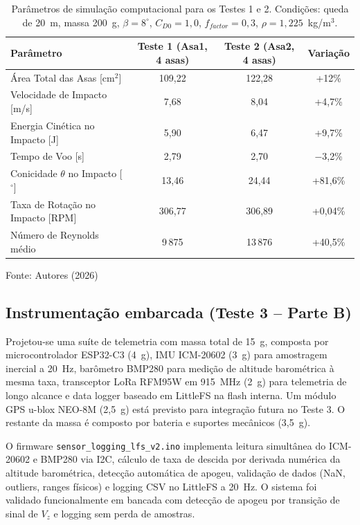 \documentclass[12pt,fleqn]{article}
\begin{document}
\begin{table}[htbp]
\caption{Parâmetros de simulação computacional para os Testes 1 e 2. Condições: queda de 20~m, massa 200~g, $\beta=8^\circ$, $C_{D0}=1,0$, $f_{factor}=0,3$, $\rho=1,225$~kg/m$^3$.}
\centering
\begin{tabular*}{\textwidth}{@{\extracolsep{\fill}}lccc}
\hline
Parâmetro & Teste 1 (Asa1, 4 asas) & Teste 2 (Asa2, 4 asas) & Variação \\
\hline
Área Total das Asas [cm$^2$] & 109,22 & 122,28 & +12\% \\
Velocidade de Impacto [m/s] & 7,68 & 8,04 & +4,7\% \\
Energia Cinética no Impacto [J] & 5,90 & 6,47 & +9,7\% \\
Tempo de Voo [s] & 2,79 & 2,70 & $-$3,2\% \\
Conicidade $\theta$ no Impacto [$^\circ$] & 13,46 & 24,44 & +81,6\% \\
Taxa de Rotação no Impacto [RPM] & 306,77 & 306,89 & +0,04\% \\
Número de Reynolds médio & 9\,875 & 13\,876 & +40,5\% \\
\hline
\end{tabular*}
{\footnotesize\centering Fonte: Autores (2026)\par}
\label{tab:testes12}
\end{table}

\subsection{Instrumentação embarcada (Teste 3 -- Parte B)}

Projetou-se uma suíte de telemetria com massa total de 15~g, composta por microcontrolador ESP32-C3 (4~g), IMU ICM-20602 (3~g) para amostragem inercial a 20~Hz, barômetro BMP280 para medição de altitude barométrica à mesma taxa, transceptor LoRa RFM95W em 915~MHz (2~g) para telemetria de longo alcance e data logger baseado em LittleFS na flash interna. Um módulo GPS u-blox NEO-8M (2,5~g) está previsto para integração futura no Teste 3. O restante da massa é composto por bateria e suportes mecânicos (3,5~g).

O firmware \texttt{sensor\_logging\_lfs\_v2.ino} implementa leitura simultânea do ICM-20602 e BMP280 via I2C, cálculo de taxa de descida por derivada numérica da altitude barométrica, detecção automática de apogeu, validação de dados (NaN, outliers, ranges físicos) e logging CSV no LittleFS a 20~Hz. O sistema foi validado funcionalmente em bancada com detecção de apogeu por transição de sinal de $V_z$ e logging sem perda de amostras.
\end{document}
